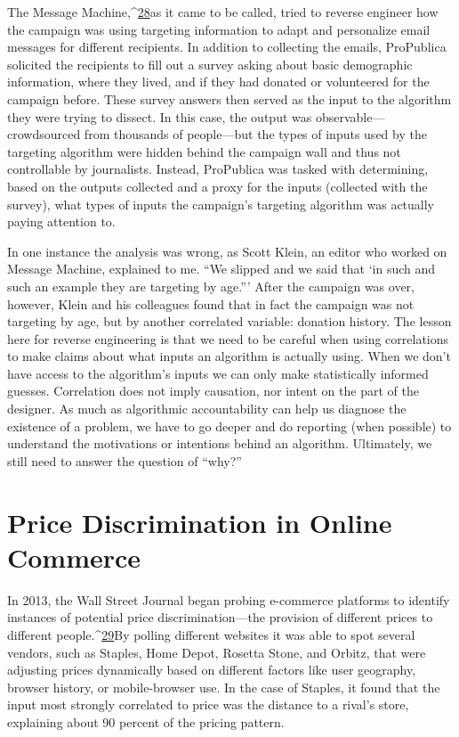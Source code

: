 The Message Machine,^{\href{#endnotes}{28}}as it came to be called, tried to reverse engineer how the campaign was using targeting information to adapt and personalize email messages for different recipients. In addition to collecting the emails, ProPublica solicited the recipients to fill out a survey asking about basic demographic information, where they lived, and if they had donated or volunteered for the campaign before. These survey answers then served as the input to the algorithm they were trying to dissect. In this case, the output was observable—crowdsourced from thousands of people—but the types of inputs used by the targeting algorithm were hidden behind the campaign wall and thus not controllable by journalists. Instead, ProPublica was tasked with determining, based on the outputs collected and a proxy for the inputs (collected with the survey), what types of inputs the campaign's targeting algorithm was actually paying attention to. 

In one instance the analysis was wrong, as Scott Klein, an editor who worked on Message Machine, explained to me. ``We slipped and we said that ‘in such and such an example they are targeting by age.''' After the campaign was over, however, Klein and his colleagues found that in fact the campaign was not targeting by age, but by another correlated variable: donation history. The lesson here for reverse engineering is that we need to be careful when using correlations to make claims about what inputs an algorithm is actually using. When we don't have access to the algorithm's inputs we can only make statistically informed guesses. Correlation does not imply causation, nor intent on the part of the designer. As much as algorithmic accountability can help us diagnose the existence of a problem, we have to go deeper and do reporting (when possible) to understand the motivations or intentions behind an algorithm. Ultimately, we still need to answer the question of ``why?'' 

\section{Price Discrimination in Online Commerce }
In 2013, the Wall Street Journal began probing e-commerce platforms to identify instances of potential price discrimination—the provision of different prices to different people.^{\href{#endnotes}{29}}By polling different websites it was able to spot several vendors, such as Staples, Home Depot, Rosetta Stone, and Orbitz, that were adjusting prices dynamically based on different factors like user geography, browser history, or mobile-browser use. In the case of Staples, it found that the input most strongly correlated to price was the distance to a rival's store, explaining about 90 percent of the pricing pattern. 

